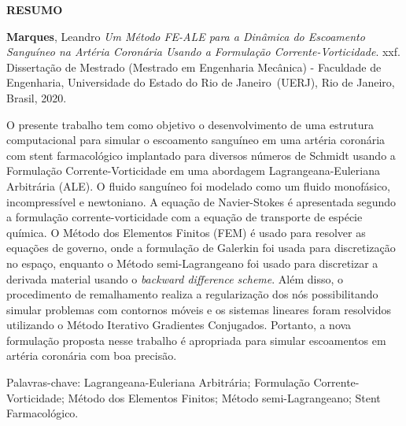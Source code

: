 \begin{center}
\textbf{RESUMO}
\end{center}


$\!$\\

\hspace{-1.3cm}\textbf{Marques}, Leandro \textit{Um Método FE-ALE para a Dinâmica do Escoamento Sanguíneo na Artéria Coronária Usando a Formulação Corrente-Vorticidade}. xxf. Dissertação de Mestrado (Mestrado em Engenharia Mecânica) - Faculdade de Engenharia, Universidade do Estado do Rio de Janeiro~(UERJ), Rio de Janeiro, Brasil, 2020.

\vspace{.2cm}

\indent 
O presente trabalho tem como objetivo o desenvolvimento 
de uma estrutura computacional para simular o escoamento 
sanguíneo em uma artéria coronária com stent farmacológico 
implantado para diversos números de Schmidt usando a Formulação Corrente-Vorticidade em uma 
abordagem Lagrangeana-Euleriana Arbitrária (ALE).
O fluido sanguíneo foi modelado como um fluido monofásico, incompressível e newtoniano.
A equação de Navier-Stokes é apresentada segundo a formulação 
corrente-vorticidade com a equação de transporte de espécie química.
O Método dos Elementos Finitos (FEM) é usado para resolver as equações 
de governo, onde a formulação de Galerkin foi usada para 
discretização no espaço, enquanto o Método semi-Lagrangeano 
foi usado para discretizar a derivada material usando 
o \textit{backward difference scheme}. 
Além disso, o procedimento de remalhamento
realiza a regularização dos nós possibilitando
simular problemas com contornos móveis e os sistemas lineares foram resolvidos utilizando o 
Método Iterativo Gradientes Conjugados.
Portanto, a nova formulação proposta
nesse trabalho é apropriada para
simular escoamentos em artéria coronária com boa precisão.

\vspace{1cm}

\hspace{-1.3cm}Palavras-chave: Lagrangeana-Euleriana Arbitrária; Formulação Corrente-Vorticidade; Método dos Elementos Finitos; Método semi-Lagrangeano; Stent Farmacológico.
